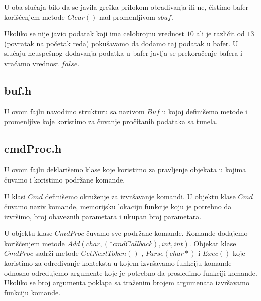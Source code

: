 \documentclass[a4paper]{extarticle}
\begin{document}
\begin{enumerate}
		U oba slučaja bilo da se javila greška prilokom obrađivanja ili ne, čistimo bafer korišćenjem metode $Clear()$ nad promenljivom $sbuf$.
		
		
		Ukoliko se nije javio podatak koji ima celobrojnu vrednost $10$ ali je različit od $13$ (povratak na početak reda)  pokušavamo da dodamo taj podatak u bafer. U slučaju neuspešnog dodavanja podatka u bafer javlja se prekoračenje bafera i vraćamo vrednost $false$. 

\end{enumerate}

\subsection{buf.h}

	U ovom fajlu navodimo strukturu sa nazivom $Buf$ u kojoj definišemo metode i promenljive koje koristimo za čuvanje pročitanih podataka sa tunela.

\subsection{cmdProc.h}

	U ovom fajlu deklarišemo klase koje koristimo za pravljenje objekata u kojima čuvamo i koristimo podržane komande.
	
	U klasi $Cmd$ definišemo okruženje za izvršavanje komandi. U objektu klase $Cmd$ čuvamo naziv komande, memorijsku lokaciju funkcije koju je potrebno da izvršimo, broj obaveznih parametara i ukupan broj parametara.
	
	U objektu klase $CmdProc$ čuvamo sve podržane komande. Komande dodajemo korišćenjem metode $Add(char, (*cmdCallback), int, int)$.
	Objekat klase $CmdProc$ sadrži metode $GetNextToken()$ , $Parse(char*)$ i $Exec()$  koje koristimo za određivanje konteksta u kojem izvršavamo funkciju komande odnosno određujemo argumente koje je potrebno da prosledimo funkciji komande. Ukoliko se broj argumenta poklapa sa traženim brojem argumenata izvršavamo funkciju komande.
		
\end{document}
